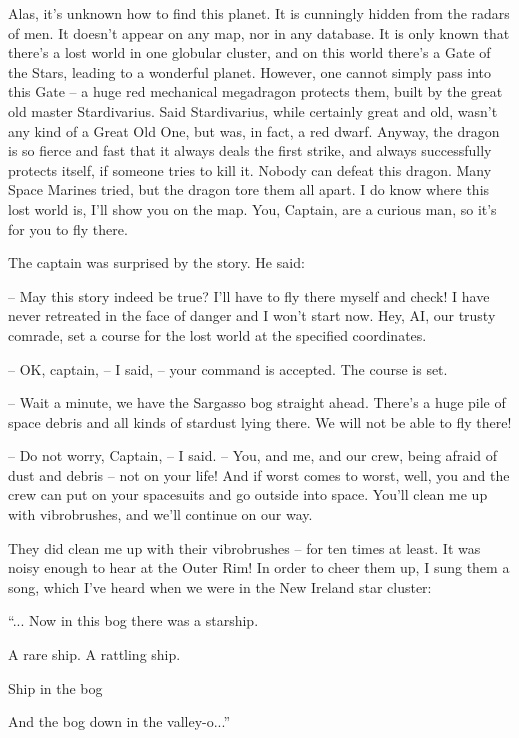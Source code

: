 \documentclass[ebook,oneside,final,openright]{memoir}
\begin{document}
Alas, it’s unknown how to find this planet. It is cunningly hidden from the radars of men. It doesn’t appear on any map, nor in any database. It is only known that there’s a lost world in one globular cluster, and on this world there’s a Gate of the Stars, leading to a wonderful planet. However, one cannot simply pass into this Gate – a huge red mechanical megadragon protects them, built by the great old master Stardivarius. Said Stardivarius, while certainly great and old, wasn’t any kind of a Great Old One, but was, in fact, a red dwarf. Anyway, the dragon is so fierce and fast that it always deals the first strike, and always successfully protects itself, if someone tries to kill it. Nobody can defeat this dragon. Many Space Marines tried, but the dragon tore them all apart. I do know where this lost world is, I’ll show you on the map. You, Captain, are a curious man, so it’s for you to fly there.\par
\par
The captain was surprised by the story. He said:\par
– May this story indeed be true? I’ll have to fly there myself and check! I have never retreated in the face of danger and I won’t start now. Hey, AI, our trusty comrade, set a course for the lost world at the specified coordinates.\par
– OK, captain, – I said, – your command is accepted. The course is set.\par
– Wait a minute, we have the Sargasso bog straight ahead. There’s a huge pile of space debris and all kinds of stardust lying there. We will not be able to fly there!\par
– Do not worry, Captain, – I said. – You, and me, and our crew, being afraid of dust and debris – not on your life! And if worst comes to worst, well, you and the crew can put on your spacesuits and go outside into space. You’ll clean me up with vibrobrushes, and we’ll continue on our way.\par
\par
They did clean me up with their vibrobrushes – for ten times at least. It was noisy enough to hear at the Outer Rim! In order to cheer them up, I sung them a song, which I’ve heard when we were in the New Ireland star cluster: \par
“... Now in this bog there was a starship.\par
A rare ship. A rattling ship.\par
Ship in the bog\par
And the bog down in the valley-o...”\par
\end{document}
